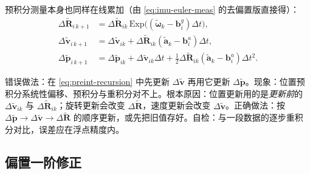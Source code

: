 预积分测量本身也同样在线累加（由 \cref{eq:imu-euler-meas} 的去偏置版直接得）：
\begin{align}
  \Delta\tilde{\mathbf R}_{i\,k+1}&=\Delta\tilde{\mathbf R}_{ik}\,\mathrm{Exp}\!\big((\tilde{\boldsymbol\omega}_k-\mathbf b_i^g)\Delta t\big),\nonumber\\
  \Delta\tilde{\mathbf v}_{i\,k+1}&=\Delta\tilde{\mathbf v}_{ik}+\Delta\tilde{\mathbf R}_{ik}(\tilde{\mathbf a}_k-\mathbf b_i^a)\Delta t,\label{eq:preint-recursion}\\
  \Delta\tilde{\mathbf p}_{i\,k+1}&=\Delta\tilde{\mathbf p}_{ik}+\Delta\tilde{\mathbf v}_{ik}\Delta t+\tfrac12\Delta\tilde{\mathbf R}_{ik}(\tilde{\mathbf a}_k-\mathbf b_i^a)\Delta t^2.\nonumber
\end{align}

\begin{pitfall}
错误做法：在 \cref{eq:preint-recursion} 中先更新 $\Delta\tilde{\mathbf v}$ 再用它更新 $\Delta\tilde{\mathbf p}$。现象：位置预积分系统性偏移、预积分与重积分对不上。根本原因：位置更新用的是\emph{更新前}的 $\Delta\tilde{\mathbf v}_{ik}$ 与 $\Delta\tilde{\mathbf R}_{ik}$；旋转更新会改变 $\Delta\tilde{\mathbf R}$，速度更新会改变 $\Delta\tilde{\mathbf v}$。正确做法：按 $\Delta\tilde{\mathbf p}\to\Delta\tilde{\mathbf v}\to\Delta\tilde{\mathbf R}$ 的顺序更新，或先把旧值存好。自检：与一段数据的逐步重积分对比，误差应在浮点精度内。
\end{pitfall}

\subsection{偏置一阶修正}
\label{subsec:bias-correction}

